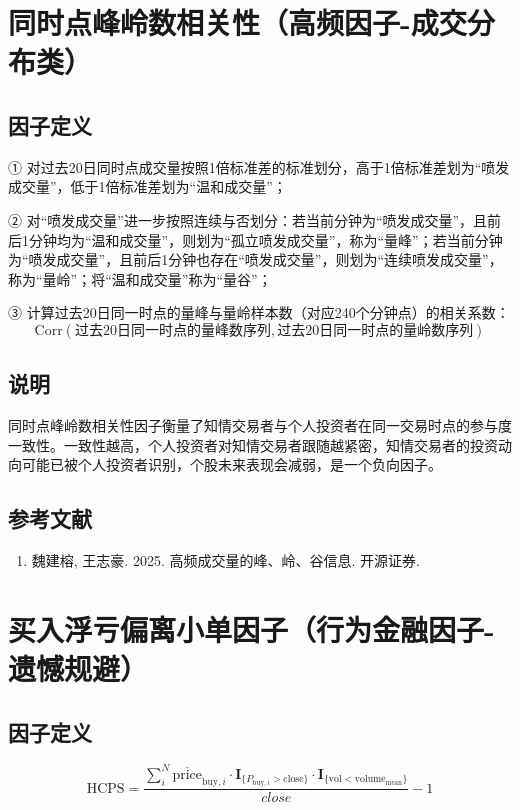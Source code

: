 \documentclass{article}
\begin{document}
\section{同时点峰岭数相关性（高频因子-成交分布类）}

\subsection{因子定义}

① 对过去20日同时点成交量按照1倍标准差的标准划分，高于1倍标准差划为“喷发成交量”，低于1倍标准差划为“温和成交量”；

② 对“喷发成交量”进一步按照连续与否划分：若当前分钟为“喷发成交量”，且前后1分钟均为“温和成交量”，则划为“孤立喷发成交量”，称为“量峰”；若当前分钟为“喷发成交量”，且前后1分钟也存在“喷发成交量”，则划为“连续喷发成交量”，称为“量岭”；将“温和成交量”称为“量谷”；

③ 计算过去20日同一时点的量峰与量岭样本数（对应240个分钟点）的相关系数：
\begin{equation}
    \mathrm{Corr}(\text{过去20日同一时点的量峰数序列}, \text{过去20日同一时点的量岭数序列})
\end{equation}

\subsection{说明}
同时点峰岭数相关性因子衡量了知情交易者与个人投资者在同一交易时点的参与度一致性。一致性越高，个人投资者对知情交易者跟随越紧密，知情交易者的投资动向可能已被个人投资者识别，个股未来表现会减弱，是一个负向因子。

\subsection{参考文献}
\begin{enumerate}
    \item 魏建榕, 王志豪. 2025. 高频成交量的峰、岭、谷信息. 开源证券.
\end{enumerate}

\section{买入浮亏偏离小单因子（行为金融因子-遗憾规避）}

\subsection{因子定义}
\begin{equation}
    \mathrm{HCPS} = \frac{\sum_{i}^{N} \overline{\mathrm{price}}_{\mathrm{buy},i} \cdot \mathbf{I}_{\{P_{\mathrm{buy},i} > \mathrm{close}\}} \cdot \mathbf{I}_{\{\mathrm{vol} < \mathrm{volume}_{\mathrm{mean}}\}}}{close} - 1
\end{equation}
\end{document}
